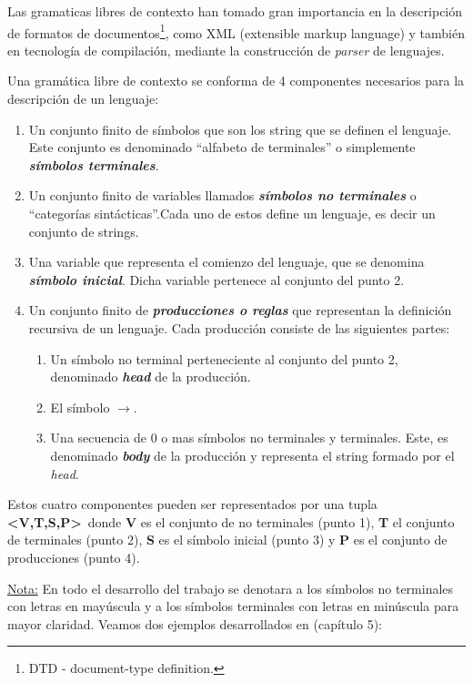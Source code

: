 Las gramaticas libres de contexto han tomado gran importancia en la descripción de formatos de documentos\footnote{ DTD - document-type definition.}, como XML (extensible markup language) y también en tecnología de compilación, mediante la construcción de \textit{parser} de lenguajes.  
\begin{definition}
Una gramática libre de contexto se conforma de 4 componentes necesarios para la descripción de un lenguaje:
\begin{enumerate}
\item Un conjunto finito de símbolos que son los string que se definen el lenguaje. Este conjunto es denominado ``alfabeto de terminales'' o simplemente \textit{\textbf{símbolos terminales}}.

\item Un conjunto finito de variables llamados \textit{\textbf{símbolos no terminales}} o ``categorías sintácticas''.Cada uno de estos define un lenguaje, es decir un conjunto de strings.

\item Una variable que representa el comienzo del lenguaje, que se denomina \textit{\textbf{símbolo inicial}}. Dicha variable pertenece al conjunto del punto 2.

\item Un conjunto finito de \textit{\textbf{producciones o reglas}} que representan la definición recursiva de un lenguaje. Cada producción consiste de las siguientes partes:

\begin{enumerate}
\item Un símbolo no terminal perteneciente al conjunto del punto 2, denominado \textit{\textbf{head}} de la producción.

\item El símbolo \textbf{$\rightarrow$}.

\item Una secuencia de 0 o mas símbolos no terminales y terminales. Este, es denominado \textit{\textbf{body}} de la producción y representa el string formado por el \textit{head}.
\end{enumerate}

\end{enumerate}

Estos cuatro componentes pueden ser representados por una tupla \textbf{<V,T,S,P>}\ donde \textbf{V} es el conjunto de no terminales (punto 1), \textbf{T} el conjunto de terminales (punto 2), \textbf{S} es el símbolo inicial (punto 3) y \textbf{P} es el conjunto de producciones (punto 4).
\end{definition}
\underline{Nota:}
En todo el desarrollo del trabajo se denotara a los símbolos no terminales con letras en mayúscula y a los símbolos terminales con letras en minúscula para mayor claridad.
Veamos dos ejemplos desarrollados en \cite{gramatica} (capítulo 5):

